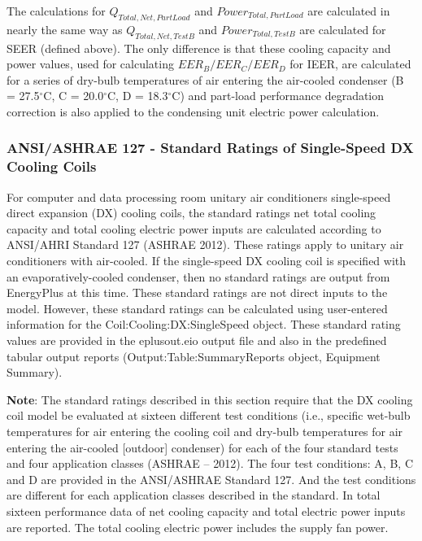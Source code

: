 The calculations for \(Q_{Total,Net,PartLoad}\) and \(Power_{Total,PartLoad}\) are calculated in nearly the same way as \(Q_{Total,Net,TestB}\) and \(Power_{Total,TestB}\) are calculated for SEER (defined above). The only difference is that these cooling capacity and power values, used for calculating \(EER_{B} / EER_{C} / EER_{D}\) for IEER, are calculated for a series of dry-bulb temperatures of air entering the air-cooled condenser (B = 27.5\(^{\circ}\)C, C = 20.0\(^{\circ}\)C, D = 18.3\(^{\circ}\)C) and part-load performance degradation correction is also applied to the condensing unit electric power calculation.

\subsubsection{ANSI/ASHRAE 127 - Standard Ratings of Single-Speed DX Cooling Coils}\label{ansiashrae-127---standard-ratings-of-single-speed-dx-cooling-coils}

For computer and data processing room unitary air conditioners single-speed direct expansion (DX) cooling coils, the standard ratings net total cooling capacity and total cooling electric power inputs are calculated according to ANSI/AHRI Standard 127 (ASHRAE 2012). These ratings apply to unitary air conditioners with air-cooled. If the single-speed DX cooling coil is specified with an evaporatively-cooled condenser, then no standard ratings are output from EnergyPlus at this time. These standard ratings are not direct inputs to the model. However, these standard ratings can be calculated using user-entered information for the Coil:Cooling:DX:SingleSpeed object. These standard rating values are provided in the eplusout.eio output file and also in the predefined tabular output reports (Output:Table:SummaryReports object, Equipment Summary).

\textbf{Note}: The standard ratings described in this section require that the DX cooling coil model be evaluated at sixteen different test conditions (i.e., specific wet-bulb temperatures for air entering the cooling coil and dry-bulb temperatures for air entering the air-cooled {[}outdoor{]} condenser) for each of the four standard tests and four application classes (ASHRAE -- 2012). The four test conditions: A, B, C and D are provided in the ANSI/ASHRAE Standard 127. And the test conditions are different for each application classes described in the standard. In total sixteen performance data of net cooling capacity and total electric power inputs are reported. The total cooling electric power includes the supply fan power.

